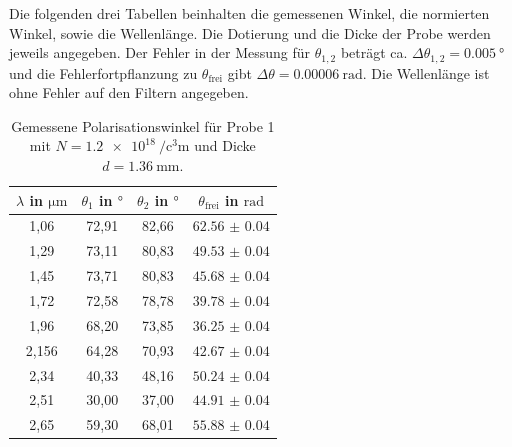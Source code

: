 Die folgenden drei Tabellen beinhalten die gemessenen Winkel, die normierten Winkel, sowie die Wellenlänge. Die Dotierung und die Dicke der Probe werden jeweils angegeben.
Der Fehler in der Messung für $\theta_{1,2}$ beträgt ca. $\Delta \theta_{1,2} = \qty{0.005}{\degree}$ und die Fehlerfortpflanzung zu $\theta_\text{frei}$ gibt $\Delta \theta = \qty{0.00006}{\radian}$.
Die Wellenlänge ist ohne Fehler auf den Filtern angegeben.
\begin{table}[H]
    \centering
    \caption{Gemessene Polarisationswinkel für Probe 1 mit $N = \qty{1.2e18}{\per\cubic\centi\meter}$ und Dicke $d = \qty{1.36}{\milli\meter}$.}
    \label{tab:probe1}
    \begin{tabular}{c c c c}
        \toprule
        {$\lambda$ in $\si{\micro\meter}$} & {$\theta_1$ in $\si{\degree}$} & {$\theta_2$ in $\si{\degree}$} & {$\theta_\text{frei}$ in $\si{\radian}$} \\
        \midrule
        1,06 & 72,91 & 82,66 & {$\num{62.56(4)}$} \\
        1,29 & 73,11 & 80,83 & {$\num{49.53(4)}$} \\
        1,45 & 73,71 & 80,83 & {$\num{45.68(4)}$} \\ 
        1,72 & 72,58 & 78,78 & {$\num{39.78(4)}$} \\ 
        1,96 & 68,20 & 73,85 & {$\num{36.25(4)}$} \\
        2,156& 64,28 & 70,93 & {$\num{42.67(4)}$} \\
        2,34 & 40,33 & 48,16 & {$\num{50.24(4)}$} \\
        2,51 & 30,00 & 37,00 & {$\num{44.91(4)}$} \\
        2,65 & 59,30 & 68,01 & {$\num{55.88(4)}$} \\
        \bottomrule
    \end{tabular}
\end{table}

